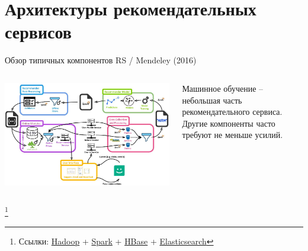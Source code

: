 \documentclass[11pt,aspectratio=169,handout]{beamer}
\begin{document}
\section{Архитектуры рекомендательных сервисов}

\begin{frame}{Обзор типичных компонентов RS / Mendeley (2016) \cite{MNDL}}
\begin{columns}
\begin{column}{0.6\textwidth}
   \begin{center}
		\includegraphics[scale=0.2]{images/mendeley.jpeg}
   \end{center}
\end{column}
\begin{column}{0.35\textwidth}
    \begin{tcolorbox}[colback=info!5,colframe=info!80,title=]
    \begin{small}
    Машинное обучение -- небольшая часть рекомендательного сервиса. Другие компоненты часто требуют не меньше усилий.
    \end{small}
    \end{tcolorbox}
\end{column}
\end{columns}

\footnote{Ссылки:
\href{https://hadoop.apache.org/}{Hadoop} +
\href{https://spark.apache.org/}{Spark} +
\href{https://hbase.apache.org/}{HBase} +
\href{https://www.elastic.co/what-is/elasticsearch}{Elasticsearch}
}

\end{frame}
\end{document}
